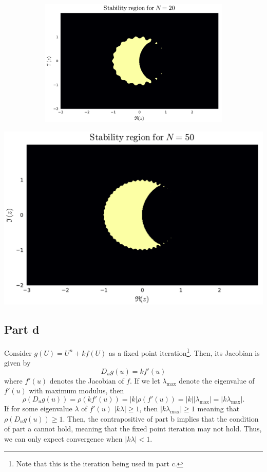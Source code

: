 \documentclass{article}
\begin{document}
\begin{figure}[H]
\begin{subfigure}{0.495\linewidth}
	\end{subfigure}
	\begin{subfigure}{0.495\linewidth}
		\centering
		\includegraphics[width=\linewidth]{N20.pdf}
	\end{subfigure}
\end{figure}
\includegraphics[scale=0.5]{N50.pdf}

\subsection{Part d}
Consider $g(U)=U^n+kf(U)$ as a fixed point iteration\footnote{Note that this is the iteration being used in part c.}. Then, its Jacobian is given by
\[
D_ug(u)=kf'(u)
\] 
where $f'(u)$ denotes the Jacobian of $f$. If we let $\lambda_{\text{max}}$ denote the eigenvalue of $f'(u)$ with maximum modulus, then
\[
\rho(D_ug(u))=\rho(kf'(u))=|k|\rho(f'(u))=|k||\lambda_{\text{max}}|=|k\lambda_{\text{max}}|.
\]
If for some eigenvalue $\lambda$ of $f'(u)$ $|k\lambda|\geq1$, then $|k\lambda_{\text{max}}|\geq1$ meaning that $\rho(D_ug(u))\geq1$. Then, the contrapositive of part b implies that the condition of part a cannot hold, meaning that the fixed point iteration may not hold. Thus, we can only expect convergence when $|k\lambda|<1$. 
\end{document}
